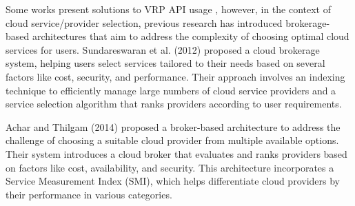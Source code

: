 Some works present solutions to VRP API usage \cite{gmaps2024, ant2024, Cavecchia2024}, however, in the context of cloud service/provider selection, previous research has introduced brokerage-based architectures that aim to address the complexity of choosing optimal cloud services for users. Sundareswaran et al. (2012) \cite{broker} proposed a cloud brokerage system, helping users select services tailored to their needs based on several factors like cost, security, and performance. Their approach involves an indexing technique to efficiently manage large numbers of cloud service providers and a service selection algorithm that ranks providers according to user requirements.



Achar and Thilgam (2014) \cite{broker2} proposed a broker-based architecture to address the challenge of choosing a suitable cloud provider from multiple available options. Their system introduces a cloud broker that evaluates and ranks providers based on factors like cost, availability, and security. This architecture incorporates a Service Measurement Index (SMI), which helps differentiate cloud providers by their performance in various categories.

